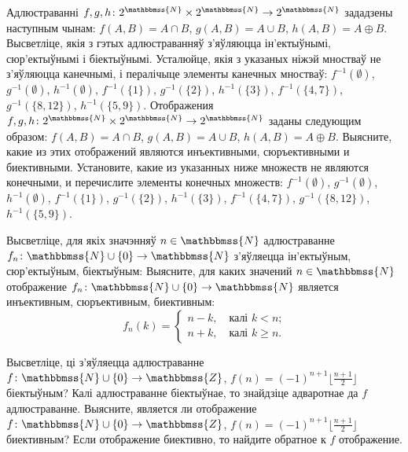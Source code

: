 \begin{problemList}
\problemItemSimple
{Адлюстраванні $f, g, h \colon 2^{\mathbbmss{N}} \times 2^{\mathbbmss{N}} \to 2^{\mathbbmss{N}}$ зададзены наступным чынам: $f(A, B) = A \cap B$,
$g(A, B) = A \cup B$, $h(A, B) = A \oplus B$. Высветліце, якія з гэтых адлюстраванняў з'яўляюцца ін'ектыўнымі, сюр'ектыўнымі і біектыўнымі. Усталюйце, якія з указаных ніжэй мностваў не з'яўляюцца канечнымі, і пералічыце элементы канечных мностваў: $f^{-1}(\emptyset)$,
$g^{-1}(\emptyset)$, $h^{-1}(\emptyset)$, $f^{-1}(\{1\})$,
$g^{-1}(\{2\})$, $h^{-1}(\{3\})$, $f^{-1}(\{4, 7\})$,
$g^{-1}(\{8, 12\})$, $h^{-1}(\{5, 9\})$.}
{Отображения $f, g, h \colon 2^{\mathbbmss{N}} \times 2^{\mathbbmss{N}} \to 2^{\mathbbmss{N}}$ заданы следующим образом: $f(A, B) = A \cap B$, $g(A, B) = A \cup B$, $h(A, B) = A \oplus B$. Выясните, какие из этих отображений являются инъективными, сюръективными и биективными. Установите, какие из указанных ниже множеств не являются конечными, и перечислите элементы конечных множеств: $f^{-1}(\emptyset)$, 
$g^{-1}(\emptyset)$, $h^{-1}(\emptyset)$, $f^{-1}(\{1\})$, 
$g^{-1}(\{2\})$, $h^{-1}(\{3\})$, $f^{-1}(\{4, 7\})$,  
$g^{-1}(\{8, 12\})$, $h^{-1}(\{5, 9\})$.}

\bigskip

\problemItemWithCommonPart
{Высветліце, для якіх значэнняў $n \in \mathbbmss{N}$ адлюстраванне $f_n \colon \mathbbmss{N} \cup \{0\} \to \mathbbmss{N}$ з'яўляецца ін'ектыўным, сюр'ектыўным, біектыўным:}
{Выясните, для каких значений $n \in \mathbbmss{N}$ отображение $f_n \colon \mathbbmss{N} \cup \{0\} \to \mathbbmss{N}$ является инъективным, сюръективным, биективным:}
{%
\begin{equation*}
f_n(k) =
\begin{cases}
n - k, \quad \text{калі $k < n$;} \\
n + k, \quad \text{калі $k \ge n$.}
\end{cases}
\end{equation*}
}

\bigskip

\problemItemSimple
{Высветліце, ці з'яўляецца адлюстраванне $f \colon \mathbbmss{N} \cup \{0\} \to \mathbbmss{Z}$, $f(n) = (-1)^{n + 1}\bigl\lfloor\frac{n + 1}{2}\bigr\rfloor$ біектыўным? Калі адлюстраванне біектыўнае, то знайдзіце адваротнае да $f$ адлюстраванне.}
{Выясните, является ли отображение $f \colon \mathbbmss{N} \cup \{0\} \to \mathbbmss{Z}$, $f(n) = (-1)^{n + 1}\bigl\lfloor\frac{n + 1}{2}\bigr\rfloor$ биективным? Если отображение биективно, то найдите обратное к $f$ отображение.}

\bigskip


\end{problemList}
